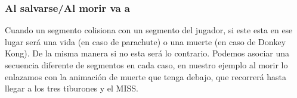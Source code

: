 \subsubsection{Al salvarse/Al morir va a}
Cuando un segmento colisiona con un segmento del jugador, si este esta en ese lugar será una vida (en caso de parachute)  o una muerte (en caso de Donkey Kong). De la misma manera si no esta será lo contrario. Podemos asociar una secuencia diferente de segmentos en cada caso, en nuestro ejemplo al morir lo enlazamos con la animación de muerte que tenga debajo, que recorrerá hasta llegar a los tres tiburones y el MISS.

\clearpage




